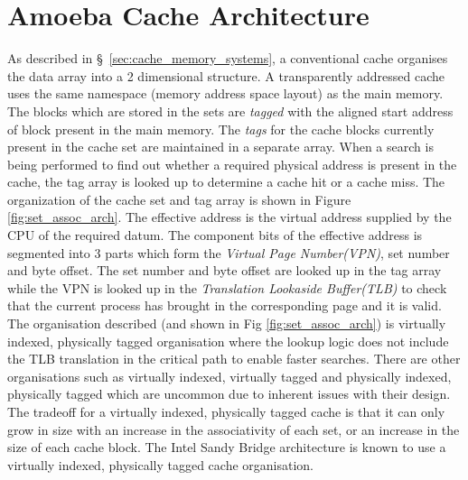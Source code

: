 %
%

\chapter{Amoeba Cache Architecture}
\label{chap:ac_architecture}

As described in \S~\ref{sec:cache_memory_systems}, a conventional cache organises the data array into a 2 dimensional structure. A transparently addressed cache uses the same namespace (memory address space layout) as the main memory. The blocks which are stored in the sets are \textit{tagged} with the aligned start address of block present in the main memory. The \textit{tags} for the cache blocks currently present in the cache set are maintained in a separate array. When a search is being performed to find out whether a required physical address is present in the cache, the tag array is looked up to determine a cache hit or a cache miss. The organization of the cache set and tag array is shown in Figure \ref{fig:set_assoc_arch}. The effective address is the virtual address supplied by the CPU of the required datum. The component bits of the effective address is segmented into 3 parts which form the \textit{Virtual Page Number(VPN)}, set number and byte offset. The set number and byte offset are looked up in the tag array while the VPN is looked up in the \textit{Translation Lookaside Buffer(TLB)} to check that the current process has brought in the corresponding page and it is valid. The organisation described (and shown in Fig \ref{fig:set_assoc_arch}) is virtually indexed, physically tagged organisation where the lookup logic does not include the TLB translation in the critical path to enable faster searches. There are other organisations such as virtually indexed, virtually tagged and physically indexed, physically tagged which are uncommon due to inherent issues with their design. The tradeoff for a virtually indexed, physically tagged cache is that it can only grow in size with an increase in the associativity of each set, or an increase in the size of each cache block. The Intel Sandy Bridge architecture is known to use a virtually indexed, physically tagged cache organisation.



